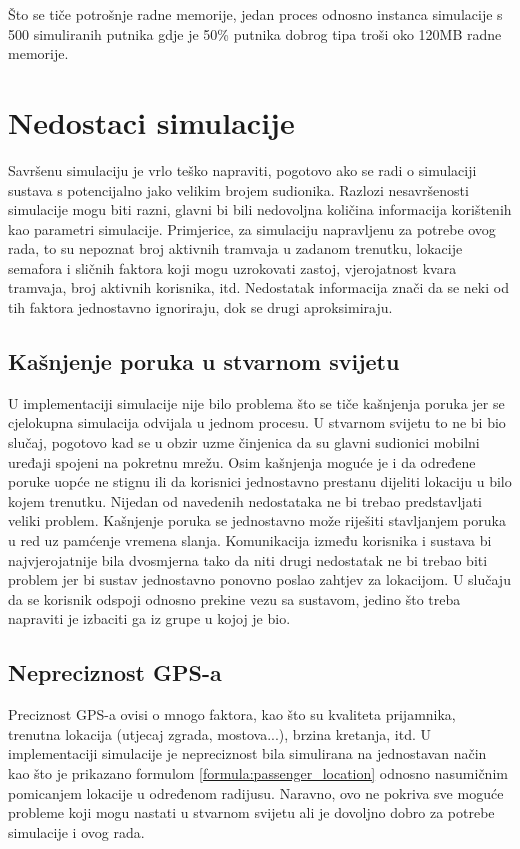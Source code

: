 \documentclass[times, utf8, diplomski]{fer}
\begin{document}
Što se tiče potrošnje radne memorije, jedan proces odnosno instanca simulacije s 500 simuliranih putnika gdje je 50\% putnika dobrog tipa troši oko 120MB radne memorije.


\section{Nedostaci simulacije}
Savršenu simulaciju je vrlo teško napraviti, pogotovo ako se radi o simulaciji sustava s potencijalno jako velikim brojem sudionika.
Razlozi nesavršenosti simulacije mogu biti razni, glavni bi bili nedovoljna količina informacija korištenih kao parametri simulacije. Primjerice, za simulaciju napravljenu za potrebe ovog rada, to su nepoznat broj aktivnih tramvaja u zadanom trenutku, lokacije semafora i sličnih faktora koji mogu uzrokovati zastoj, vjerojatnost kvara tramvaja, broj aktivnih korisnika, itd. Nedostatak informacija znači da se neki od tih faktora jednostavno ignoriraju, dok se drugi aproksimiraju.

\subsection{Kašnjenje poruka u stvarnom svijetu}
U implementaciji simulacije nije bilo problema što se tiče kašnjenja poruka jer se cjelokupna simulacija odvijala u jednom procesu. U stvarnom svijetu to ne bi bio slučaj, pogotovo kad se u obzir uzme činjenica da su glavni sudionici mobilni uređaji spojeni na pokretnu mrežu. Osim kašnjenja moguće je i da određene poruke uopće ne stignu ili da korisnici jednostavno prestanu dijeliti lokaciju u bilo kojem trenutku. Nijedan od navedenih nedostataka ne bi trebao predstavljati veliki problem. Kašnjenje poruka se jednostavno može riješiti stavljanjem poruka u red uz pamćenje vremena slanja. Komunikacija između korisnika i sustava bi najvjerojatnije bila dvosmjerna tako da niti drugi nedostatak ne bi trebao biti problem jer bi sustav jednostavno ponovno poslao zahtjev za lokacijom. U slučaju da se korisnik odspoji odnosno prekine vezu sa sustavom, jedino što treba napraviti je izbaciti ga iz grupe u kojoj je bio.

\subsection{Nepreciznost GPS-a}
Preciznost GPS-a ovisi o mnogo faktora, kao što su kvaliteta prijamnika, trenutna lokacija (utjecaj zgrada, mostova...), brzina kretanja, itd. U implementaciji simulacije je nepreciznost bila simulirana na jednostavan način kao što je prikazano formulom \ref{formula:passenger_location} odnosno nasumičnim pomicanjem lokacije u određenom radijusu. Naravno, ovo ne pokriva sve moguće probleme koji mogu nastati u stvarnom svijetu ali je dovoljno dobro za potrebe simulacije i ovog rada.
\end{document}
